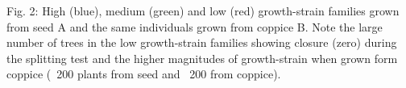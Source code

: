 Fig. 2: High (blue), medium (green) and low (red) growth-strain families grown from seed A and the same individuals grown from coppice B. Note the large number of trees in the low growth-strain families showing closure (zero) during the splitting test and the higher magnitudes of growth-strain when grown form coppice (~200 plants from seed and ~200 from coppice).